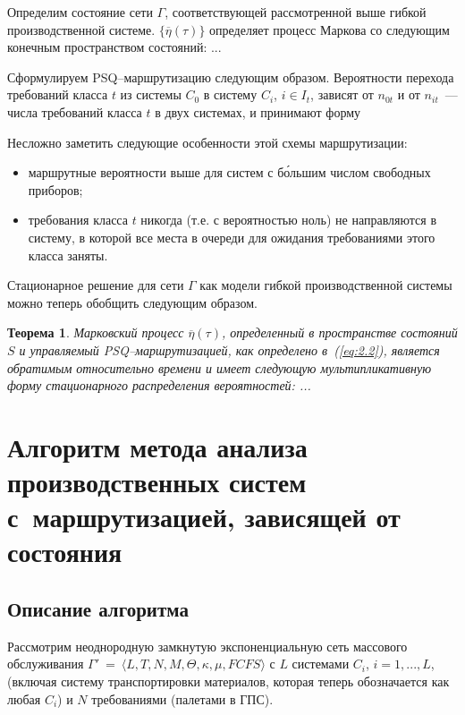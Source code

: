 \documentclass[a4paper,14pt]{extarticle}
\theoremstyle{note}
\newtheorem{theorem}{Теорема}
\begin{document}
Определим состояние сети $\Gamma$, соответствующей рассмотренной выше гибкой производственной системе. $\{ \overline{\eta}(\tau) \}$ определяет процесс Маркова со следующим конечным пространством состояний: ...

Сформулируем PSQ--маршрутизацию следующим образом. Вероятности перехода требований класса $t$ из системы $C_0$ в систему $C_i$, $i \in I_t$, зависят от $n_{0t}$ и от $n_{it}$~--- числа требований класса $t$ в двух системах, и принимают форму

Несложно заметить следующие особенности этой схемы маршрутизации:
\begin{itemize}
\item маршрутные вероятности выше для систем с б\'{о}льшим числом свободных приборов;
\item требования класса $t$ никогда (т.е. с вероятностью ноль) не направляются в систему, в которой все места в очереди для ожидания требованиями этого класса заняты.
\end{itemize}

Стационарное решение для сети $\Gamma$ как модели гибкой производственной системы можно теперь обобщить следующим образом.

\begin{theorem}
 Марковский процесс $\overline{\eta}(\tau)$, определенный в пространстве состояний $S$ и управляемый PSQ--маршрутизацией, как определено в~(\ref{eq:2.2}), является обратимым относительно времени и имеет следующую мультипликативную форму стационарного распределения вероятностей: ...
\end{theorem}




\section{Алгоритм метода анализа производственных систем с~маршрутизацией, зависящей от состояния}
\label{sec:algorithm}

\subsection{Описание алгоритма}
\label{subsec:algorithm_description}

Рассмотрим неоднородную замкнутую экспоненциальную сеть массового обслуживания $\Gamma'~=~\langle L, T, N, M, \Theta, \kappa, \mu, FCFS \rangle$ с $L$ системами $C_i$, $i=1,...,L$, (включая систему транспортировки материалов, которая теперь обозначается как любая $C_i$) и $N$ требованиями (палетами в ГПС).
\end{document}
